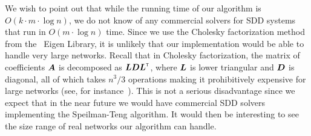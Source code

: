 We wish to point out that while the running time of our algorithm is 
$O(k \cdot m \cdot \log n)$, we do not know of any commercial solvers 
for SDD systems that run in $O(m \cdot \log n)$ time. Since we use the Cholesky 
factorization method from the \CPP\ Eigen Library, it is unlikely that our 
implementation would be able to handle very large networks. Recall that 
in Cholesky factorization, the matrix of coefficients $\boldsymbol{A}$ is decomposed 
as $\boldsymbol{L} \boldsymbol{D} {\boldsymbol{L}}^{\scriptscriptstyle \mathsf{T}}$, where $\boldsymbol{L}$ is lower triangular 
and $\boldsymbol{D}$ is diagonal, all of which takes $n^3/3$ operations making it 
prohibitively expensive for large networks (see, for instance~\cite{GvL13}). 
This is not a serious disadvantage since we expect that in the near future 
we would have commercial SDD solvers implementing the Speilman-Teng algorithm. 
It would then be interesting to see the size range of real networks our algorithm 
can handle. 





